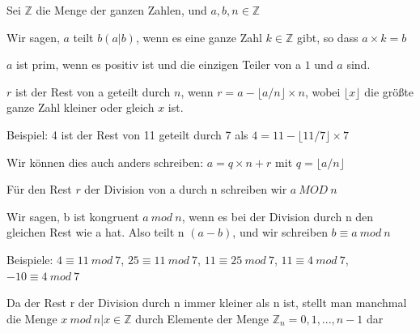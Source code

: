 \documentclass[a4paper]{article}
\begin{document}
\begin{multicols}{3}
      \begin{itemize*}
            \item Sei $\mathbb{Z}$ die Menge der ganzen Zahlen, und
            $a,b,n\in\mathbb{Z}$
            \item Wir sagen, $a$ teilt $b(a| b)$, wenn es eine ganze Zahl
            $k\in\mathbb{Z}$ gibt, so dass
            $a\times k=b$
            \item $a$ ist prim, wenn es positiv ist und die einzigen Teiler von a
            $1$ und $a$ sind.
            \item $r$ ist der Rest von a geteilt durch $n$, wenn
            $r=a-\lfloor a / n
                  \rfloor\times n$, wobei
            $\lfloor x\rfloor$ die größte ganze Zahl
            kleiner oder gleich $x$ ist.
            \begin{itemize*}
                  \item Beispiel: 4 ist der Rest von 11 geteilt durch 7 als $4=11-\lfloor 11/7\rfloor\times 7$
                  \item Wir können dies auch anders schreiben: $a=q\times n + r$ mit $q=\lfloor a/n\rfloor$
            \end{itemize*}
            \item Für den Rest $r$ der Division von a durch n schreiben wir
            $a\ MOD\ n$
            \item Wir sagen, b ist kongruent $a\ mod\ n$, wenn es bei der Division durch n den gleichen Rest wie a hat.
            Also teilt n $(a-b)$, und wir schreiben $b\equiv a\ mod\ n$
            \begin{itemize*}
                  \item Beispiele: $4\equiv 11\ mod\ 7$, $25\equiv 11\ mod\ 7$, $11\equiv 25\ mod\ 7$, $11\equiv 4\ mod\ 7$, $-10\equiv 4\ mod\ 7$
            \end{itemize*}
            \item Da der Rest r der Division durch n immer kleiner als n ist, stellt man manchmal die Menge ${x\ mod\ n | x\in\mathbb{Z}}$ durch Elemente der Menge $\mathbb{Z}_n={0, 1, ...,
                  n-1}$ dar
      \end{itemize*}


\end{multicols}
\end{document}
